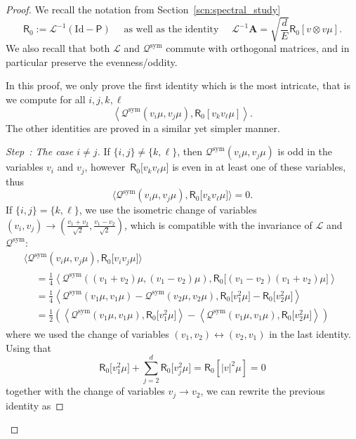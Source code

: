 \documentclass[AHL,Unicode,longabstracts,published]{cedram}
\newcommand{\sym}{\mathrm{sym}}
\newcommand{\Id}{\mathrm{Id}}
\newcommand{\sfR}{\mathsf{R}}
\newcommand{\BurA}{{\mathbf{A}}}
\newcommand{\LL}{\mathcal{L}}
\newcommand{\PP}{\mathsf{P}}
\newcommand{\QQ}{\mathcal{Q}}
\newcommand{\la}{\langle}
\newcommand{\ra}{\rangle}
\newcounter{stepcount}
\newenvironment{step}[1]{\refstepcounter{stepcount}\begin{proof}[Step~\thestepcount: #1]}{\let\qed\relax\end{proof}}
\begin{document}
\begin{proof}
We recall the notation from Section~\ref{scn:spectral_study}
\[
\sfR_0 := \LL^{-1} \left(\Id - \PP\right) \quad \text{ as well as the identity } \quad \LL^{-1}\BurA = \sqrt{ \frac{d}{E} } \sfR_0 \left[v \otimes v \mu \right].
\]
We also recall that both $\LL$ and $\QQ^\sym$ commute with orthogonal matrices, and in particular preserve the evenness/oddity.

In this proof, we only prove the first identity which is the most intricate, that is we compute for all $i, j, k, \ell$
\[
\left\la \QQ^\sym(v_i \mu, v_j \mu), \sfR_0 \left[v_k v_\ell \mu \right] \right\ra.
\]
The other identities are proved in a similar yet simpler manner.

\setcounter{stepcount}{0}
\begin{step}{{The case $i \neq j$}}
If $\{ i, j \} \neq \{ k, \ell \}$, then $\QQ^\sym(v_i \mu, v_j \mu)$ is odd in the variables $v_i$ and $v_j$, however~$\sfR_0 \big[v_k v_\ell \mu \big]$ is even in at least one of these variables, thus
\[
\big\la \QQ^\sym(v_i \mu, v_j \mu), \sfR_0 \big[v_k v_\ell \mu \big] \big\ra = 0.
\]
If $\{ i, j \} = \{ k, \ell \}$, we use the isometric change of variables $(v_i, v_j) \rightarrow \left(\frac{v_1 + v_2}{\sqrt{2} }, \frac{v_1 - v_2}{\sqrt{2} } \right)$, which is compatible with the invariance of $\LL$ and $\QQ^\sym$:
\begin{multline*}
\big\la \QQ^\sym(v_i \mu, v_j \mu), \sfR_0 \big[v_i v_j \mu \big] \big\ra\\
\begin{aligned}
&= \frac{1}{4} \left\la \QQ^\sym((v_1 + v_2) \mu, (v_1 - v_2) \mu), \sfR_0 \big[(v_1-v_2) (v_1 + v_2) \mu \big] \right\ra \\
&= \frac{1}{4} \left\langle \QQ^\sym(v_1 \mu, v_1 \mu) - \QQ^\sym(v_2 \mu, v_2 \mu), \sfR_0 \big[v_1^2 \mu \big] - \sfR_0 \big[v_2^2 \mu \big] \right\rangle \\
&= \frac{1}{2} \left(\left\la \QQ^\sym(v_1 \mu, v_1 \mu), \sfR_0 \big[v_1^2 \mu \big] \right\ra - \left\la \QQ^\sym(v_1 \mu, v_1 \mu), \sfR_0 \big[v_2^2 \mu \big] \right\ra\right)
\end{aligned}
\end{multline*}
where we used the change of variables $(v_1, v_2) \leftrightarrow (v_2, v_1)$ in the last identity. Using that
\[
\sfR_0 \big[v_1^2 \mu \big] + \sum_{j = 2}^d \sfR_0 \big[v_j^2 \mu \big] = \sfR_0 \left[|v|^2 \mu \right] = 0
\]
together with the change of variables $v_j \rightarrow v_2$, we can rewrite the previous identity as

\end{step}
\end{proof}
\end{document}
